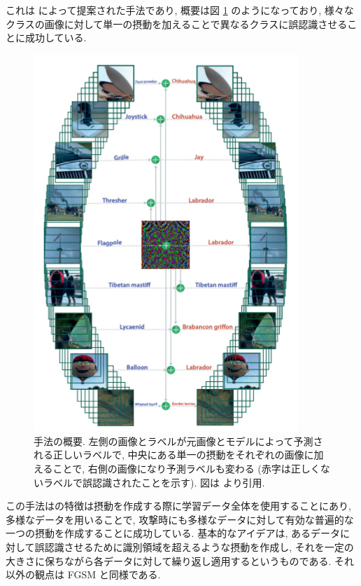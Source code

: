 これは \cite{moosavi2017universal} によって提案された手法であり, 概要は図 \ref{fig:universal-adversarial-summary} のようになっており, 様々なクラスの画像に対して単一の摂動を加えることで異なるクラスに誤認識させることに成功している.
%
\begin{figure}[htbp]
\begin{center}
\includegraphics[width=10.0cm]{figures/universal-adversarial-summary.pdf}
\end{center}
\caption{
手法の概要.
左側の画像とラベルが元画像とモデルによって予測される正しいラベルで, 中央にある単一の摂動をそれぞれの画像に加えることで, 右側の画像になり予測ラベルも変わる (赤字は正しくないラベルで誤認識されたことを示す).
図は \cite{moosavi2017universal} より引用.
}
\label{fig:universal-adversarial-summary}
\end{figure}
%

この手法はの特徴は摂動を作成する際に学習データ全体を使用することにあり, 多様なデータを用いることで, 攻撃時にも多様なデータに対して有効な普遍的な一つの摂動を作成することに成功している.
基本的なアイデアは, あるデータに対して誤認識させるために識別領域を超えるような摂動を作成し, それを一定の大きさに保ちながら各データに対して繰り返し適用するというものである.
それ以外の観点は FGSM と同様である.

